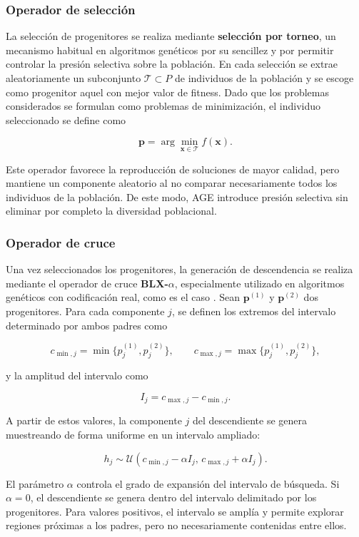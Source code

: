 \subsubsection{Operador de selección}

La selección de progenitores se realiza mediante \textbf{selección por torneo}, un mecanismo habitual en algoritmos genéticos por su sencillez y por permitir controlar la presión selectiva sobre la población. En cada selección se extrae aleatoriamente un subconjunto \(\mathcal{T}\subset P\) de individuos de la población y se escoge como progenitor aquel con mejor valor de fitness. Dado que los problemas considerados se formulan como problemas de minimización, el individuo seleccionado se define como

\[
    \mathbf{p} = \arg\min_{\mathbf{x}\in \mathcal{T}} f(\mathbf{x}).
\]

Este operador favorece la reproducción de soluciones de mayor calidad, pero mantiene un componente aleatorio al no comparar necesariamente todos los individuos de la población. De este modo, AGE introduce presión selectiva sin eliminar por completo la diversidad poblacional.

\subsubsection{Operador de cruce}

Una vez seleccionados los progenitores, la generación de descendencia se realiza mediante el operador de cruce \textbf{BLX-\(\alpha\)}, especialmente utilizado en algoritmos genéticos con codificación real, como es el caso \cite{eshelman1993interval}. Sean \(\mathbf{p}^{(1)}\) y \(\mathbf{p}^{(2)}\) dos progenitores. Para cada componente \(j\), se definen los extremos del intervalo determinado por ambos padres como

\[
    c_{\min,j} = \min\{p^{(1)}_j,p^{(2)}_j\},
    \qquad
    c_{\max,j} = \max\{p^{(1)}_j,p^{(2)}_j\},
\]

y la amplitud del intervalo como

\[
    I_j = c_{\max,j} - c_{\min,j}.
\]

A partir de estos valores, la componente \(j\) del descendiente se genera muestreando de forma uniforme en un intervalo ampliado:

\[
    h_j \sim \mathcal{U}
    \left(
    c_{\min,j} - \alpha I_j,\,
    c_{\max,j} + \alpha I_j
    \right).
\]

El parámetro \(\alpha\) controla el grado de expansión del intervalo de búsqueda. Si \(\alpha=0\), el descendiente se genera dentro del intervalo delimitado por los progenitores. Para valores positivos, el intervalo se amplía y permite explorar regiones próximas a los padres, pero no necesariamente contenidas entre ellos.

